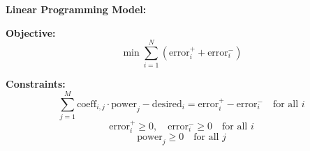 \documentclass{article}
\begin{document}
\textbf{Linear Programming Model:}

\textbf{Objective:}
\[
\min \sum_{i=1}^{N} (\text{error}_i^+ + \text{error}_i^-)
\]

\textbf{Constraints:}
\[
\sum_{j=1}^{M} \text{coeff}_{i,j} \cdot \text{power}_j - \text{desired}_i = \text{error}_i^+ - \text{error}_i^- \quad \text{for all } i
\]
\[
\text{error}_i^+ \geq 0, \quad \text{error}_i^- \geq 0 \quad \text{for all } i
\]
\[
\text{power}_j \geq 0 \quad \text{for all } j
\]
\end{document}
